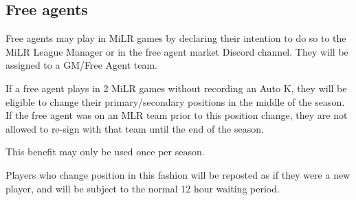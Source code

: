 \subsection{Free agents}
\label{sec:MiLR FA}
\begin{deepEnumerate}
    \item Free agents may play in MiLR games by declaring their intention to do so to the MiLR League Manager or in the free agent market Discord channel. 
    They will be assigned to a GM/Free Agent team.
    \item If a free agent plays in 2 MiLR games without recording an Auto K, they will be eligible to change their primary/secondary positions in the middle of the season. 
    If the free agent was on an MLR team prior to this position change, they are not allowed to re-sign with that team until the end of the season.
    \begin{deepEnumerate}
        \item This benefit may only be used once per season.
        \item Players who change position in this fashion will be reposted as if they were a new player, and will be subject to the normal 12 hour waiting period.        
    \end{deepEnumerate}
\end{deepEnumerate}
